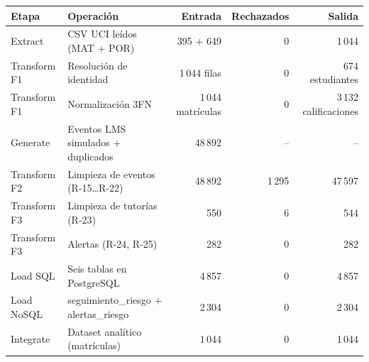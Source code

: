 \begin{tabular}{llrrr}
\toprule
Etapa & Operación & Entrada & Rechazados & Salida \\
\midrule
Extract & CSV UCI leídos (MAT + POR) & 395 + 649 & 0 & 1\,044 \\
Transform F1 & Resolución de identidad & 1\,044 filas & 0 & 674 estudiantes \\
Transform F1 & Normalización 3FN & 1\,044 matrículas & 0 & 3\,132 calificaciones \\
Generate & Eventos LMS simulados + duplicados & 48\,892 & -- & -- \\
Transform F2 & Limpieza de eventos (R-15…R-22) & 48\,892 & 1\,295 & 47\,597 \\
Transform F3 & Limpieza de tutorías (R-23) & 550 & 6 & 544 \\
Transform F3 & Alertas (R-24, R-25) & 282 & 0 & 282 \\
Load SQL & Seis tablas en PostgreSQL & 4\,857 & 0 & 4\,857 \\
Load NoSQL & seguimiento\_riesgo + alertas\_riesgo & 2\,304 & 0 & 2\,304 \\
Integrate & Dataset analítico (matrículas) & 1\,044 & 0 & 1\,044 \\
\bottomrule
\end{tabular}
